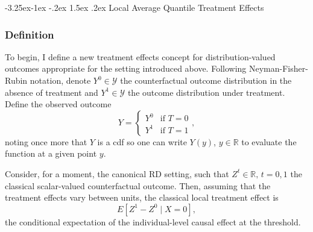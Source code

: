 \documentclass[12pt]{article}
\makeatletter
\renewcommand\subsection{\@startsection{subsection}{2}{\z@}%
  {-3.25ex\@plus -1ex \@minus -.2ex}%
  {1.5ex \@plus .2ex}%
  {\itshape\large\center}} %
\makeatother
\begin{document}
\subsection{Local Average Quantile Treatment Effects}

\subsubsection{Definition} 
To begin, I define a new  treatment effects concept for distribution-valued outcomes appropriate for the setting introduced above. Following Neyman-Fisher-Rubin notation, denote $Y^0 \in \mathcal{Y}$ the counterfactual outcome distribution in the absence of treatment and $Y^1 \in \mathcal{Y}$ the outcome distribution under treatment. Define the observed outcome \[ Y = \begin{cases} Y^0 & \text{if } T = 0 \\
Y^1 & \text{if } T = 1\end{cases},\]
noting once more that $Y$ is a cdf so one can write $Y(y)$, $y\in \mathbb{R}$ to evaluate the function at a given point $y$. 

Consider, for a moment, the canonical RD setting, such that $Z^t \in \mathbb{R}, \, t\!=\!0,1$ the classical scalar-valued counterfactual outcome. Then, assuming that the treatment effects vary between units, the classical local treatment effect is \citep{hahn2001identification}
\[
E[Z^1 - Z^0 \mid X = 0],
\]
the conditional expectation of the individual-level causal effect at the threshold. 
\end{document}
